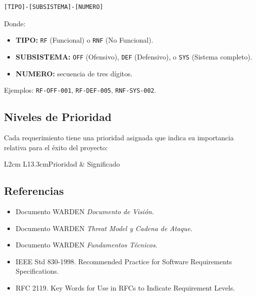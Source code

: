 \documentclass[11pt,a4paper]{article}
\begin{document}
\begin{verbatim}
[TIPO]-[SUBSISTEMA]-[NUMERO]
\end{verbatim}

Donde:

\begin{itemize}
  \item \textbf{TIPO:} \texttt{RF} (Funcional) o \texttt{RNF} (No
    Funcional).
  \item \textbf{SUBSISTEMA:} \texttt{OFF} (Ofensivo), \texttt{DEF}
    (Defensivo), o \texttt{SYS} (Sistema completo).
  \item \textbf{NUMERO:} secuencia de tres dígitos.
\end{itemize}

Ejemplos: \texttt{RF-OFF-001}, \texttt{RF-DEF-005}, \texttt{RNF-SYS-002}.

\subsection{Niveles de Prioridad}
Cada requerimiento tiene una prioridad asignada que indica su importancia
relativa para el éxito del proyecto:

\begin{datatable}{L{2cm} L{13.3cm}}{Prioridad & Significado}
\end{datatable}

\subsection{Referencias}
\begin{itemize}
  \item Documento WARDEN \emph{Documento de Visión}.
  \item Documento WARDEN \emph{Threat Model y Cadena de Ataque}.
  \item Documento WARDEN \emph{Fundamentos Técnicos}.
  \item IEEE Std 830-1998. Recommended Practice for Software Requirements
    Specifications.
  \item RFC 2119. Key Words for Use in RFCs to Indicate Requirement
    Levels.
\end{itemize}
\end{document}

